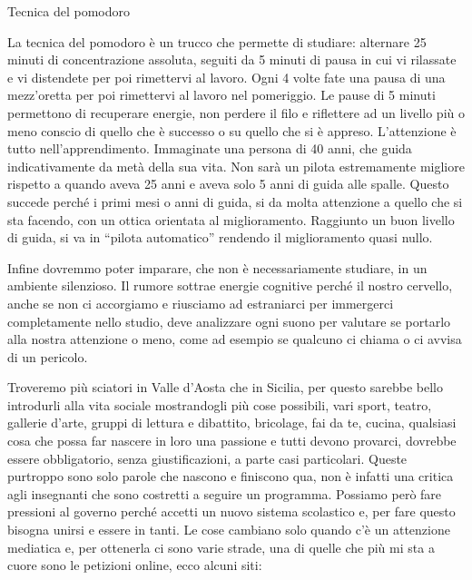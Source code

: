 \documentclass[12pt]{book} %
\begin{document}
\bigskip
\begin{mdframed}[linewidth=1pt]
Tecnica del pomodoro

La tecnica del pomodoro è un trucco che permette di studiare: alternare 25 minuti di concentrazione assoluta, seguiti da
5 minuti di pausa in cui vi rilassate e vi distendete per poi rimettervi al lavoro. Ogni 4 volte fate una pausa di una
mezz'oretta per poi rimettervi al lavoro nel pomeriggio. Le pause di 5 minuti permettono di
recuperare energie, non perdere il filo e riflettere ad un livello più o meno conscio di quello che è successo o su
quello che si è appreso. L'attenzione è tutto nell'apprendimento. Immaginate
una persona di 40 anni, che guida indicativamente da metà della sua vita. Non sarà un pilota estremamente migliore
rispetto a quando aveva 25 anni e aveva solo 5 anni di guida alle spalle. Questo succede perché i primi mesi o anni di
guida, si da molta attenzione a quello che si sta facendo, con un ottica orientata al miglioramento. Raggiunto un buon
livello di guida, si va in “pilota automatico” rendendo il miglioramento quasi nullo.

Infine dovremmo poter imparare, che non è necessariamente studiare, in un ambiente silenzioso. Il rumore sottrae energie
cognitive perché il nostro cervello, anche se non ci accorgiamo e riusciamo ad estraniarci per immergerci completamente
nello studio, deve analizzare ogni suono per valutare se portarlo alla nostra attenzione o meno, come ad esempio se
qualcuno ci chiama o ci avvisa di un pericolo.
\end{mdframed}

\bigskip

Troveremo più sciatori in Valle d'Aosta che in Sicilia, per questo sarebbe bello introdurli alla
vita sociale mostrandogli più cose possibili, vari sport, teatro, gallerie d'arte, gruppi di
lettura e dibattito, bricolage, fai da te, cucina, qualsiasi cosa che possa far nascere in loro una passione e tutti
devono provarci, dovrebbe essere obbligatorio, senza giustificazioni, a parte casi particolari. Queste purtroppo sono
solo parole che nascono e finiscono qua, non è infatti una critica agli insegnanti che sono costretti a seguire un
programma. Possiamo però fare pressioni al governo perché accetti un nuovo sistema scolastico e, per fare questo
bisogna unirsi e essere in tanti. Le cose cambiano solo quando c'è un attenzione mediatica e, per
ottenerla ci sono varie strade, una di quelle che più mi sta a cuore sono le petizioni online, ecco alcuni siti:
\end{document}

